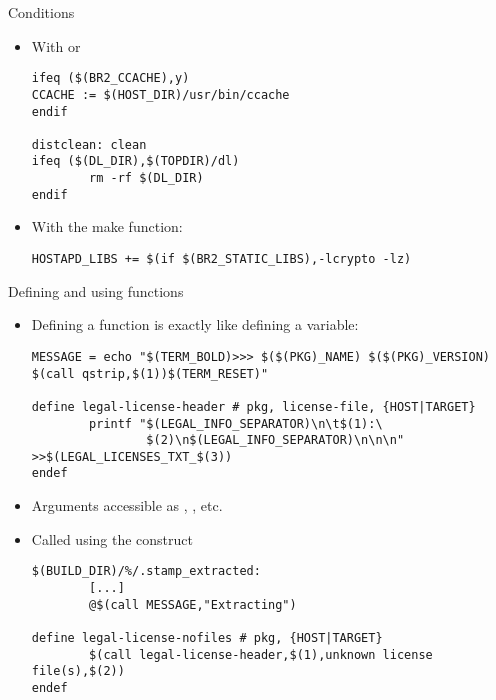 \begin{frame}[fragile]{Conditions}
  \begin{itemize}
  \item With  or 
    \begin{block}{}
\begin{verbatim}
ifeq ($(BR2_CCACHE),y)
CCACHE := $(HOST_DIR)/usr/bin/ccache
endif

distclean: clean
ifeq ($(DL_DIR),$(TOPDIR)/dl)
        rm -rf $(DL_DIR)
endif
\end{verbatim}
    \end{block}
  \item With the  make function:
    \begin{block}{}
\begin{verbatim}
HOSTAPD_LIBS += $(if $(BR2_STATIC_LIBS),-lcrypto -lz)
\end{verbatim}
    \end{block}
  \end{itemize}
\end{frame}

\begin{frame}[fragile]{Defining and using functions}
  \begin{itemize}
  \item Defining a function is exactly like defining a variable:
    \begin{block}{}
\begin{verbatim}
MESSAGE = echo "$(TERM_BOLD)>>> $($(PKG)_NAME) $($(PKG)_VERSION) $(call qstrip,$(1))$(TERM_RESET)"

define legal-license-header # pkg, license-file, {HOST|TARGET}
        printf "$(LEGAL_INFO_SEPARATOR)\n\t$(1):\
                $(2)\n$(LEGAL_INFO_SEPARATOR)\n\n\n" >>$(LEGAL_LICENSES_TXT_$(3))
endef
\end{verbatim}
    \end{block}
  \item Arguments accessible as , , etc.
  \item Called using the  construct
    \begin{block}{}
\begin{verbatim}
$(BUILD_DIR)/%/.stamp_extracted:
        [...]
        @$(call MESSAGE,"Extracting")

define legal-license-nofiles # pkg, {HOST|TARGET}
        $(call legal-license-header,$(1),unknown license file(s),$(2))
endef
\end{verbatim}
    \end{block}
  \end{itemize}
\end{frame}

